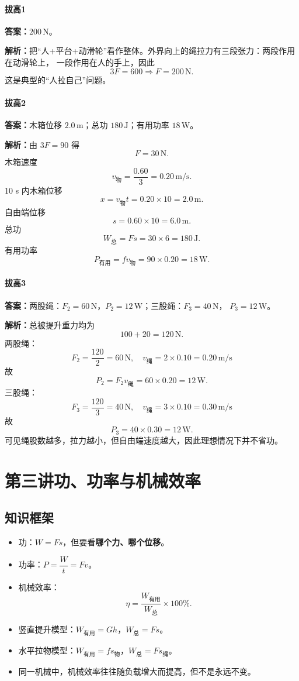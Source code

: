 \documentclass[12pt,a4paper]{ctexart}
\newcommand{\Ans}[1]{\par\noindent\textbf{答案：}#1\par}
\newcommand{\Sol}[1]{\par\noindent\textbf{解析：}#1\par}
\begin{document}
\paragraph{拔高1}
\Ans{$200\,\mathrm{N}$。}
\Sol{把“人+平台+动滑轮”看作整体。外界向上的绳拉力有三段张力：两段作用在动滑轮上，
一段作用在人的手上，因此
\[
3F=600 \Rightarrow F=200\,\mathrm{N}.
\]
这是典型的“人拉自己”问题。}

\paragraph{拔高2}
\Ans{木箱位移 $2.0\,\mathrm{m}$；总功 $180\,\mathrm{J}$；有用功率 $18\,\mathrm{W}$。}
\Sol{由 $3F=90$ 得
\[
F=30\,\mathrm{N}.
\]
木箱速度
\[
v_{\text{物}}=\frac{0.60}{3}=0.20\,\mathrm{m/s}.
\]
10 s 内木箱位移
\[
x=v_{\text{物}}t=0.20\times 10=2.0\,\mathrm{m}.
\]
自由端位移
\[
s=0.60\times 10=6.0\,\mathrm{m}.
\]
总功
\[
W_{\text{总}}=Fs=30\times 6=180\,\mathrm{J}.
\]
有用功率
\[
P_{\text{有用}}=fv_{\text{物}}=90\times 0.20=18\,\mathrm{W}.
\]}

\paragraph{拔高3}
\Ans{两股绳：$F_2=60\,\mathrm{N}$，$P_2=12\,\mathrm{W}$；三股绳：$F_3=40\,\mathrm{N}$，
$P_3=12\,\mathrm{W}$。}
\Sol{总被提升重力均为
\[
100+20=120\,\mathrm{N}.
\]
两股绳：
\[
F_2=\frac{120}{2}=60\,\mathrm{N},\quad v_{\text{绳}}=2\times 0.10=0.20\,\mathrm{m/s}
\]
故
\[
P_2=F_2v_{\text{绳}}=60\times 0.20=12\,\mathrm{W}.
\]
三股绳：
\[
F_3=\frac{120}{3}=40\,\mathrm{N},\quad v_{\text{绳}}=3\times 0.10=0.30\,\mathrm{m/s}
\]
故
\[
P_3=40\times 0.30=12\,\mathrm{W}.
\]
可见绳股数越多，拉力越小，但自由端速度越大，因此理想情况下并不省功。}

\clearpage
\section{第三讲\texorpdfstring{\quad}{ }功、功率与机械效率}

\subsection{知识框架}
\begin{itemize}[leftmargin=2.2em]
\item 功：$W=Fs$，但要看\textbf{哪个力、哪个位移}。
\item 功率：$P=\dfrac{W}{t}=Fv$。
\item 机械效率：
\[
\eta=\frac{W_{\text{有用}}}{W_{\text{总}}}\times 100\%.
\]
\item 竖直提升模型：$W_{\text{有用}}=Gh$，$W_{\text{总}}=Fs$。
\item 水平拉物模型：$W_{\text{有用}}=fs_{\text{物}}$，$W_{\text{总}}=Fs_{\text{绳}}$。
\item 同一机械中，机械效率往往随负载增大而提高，但不是永远不变。
\end{itemize}
\end{document}
